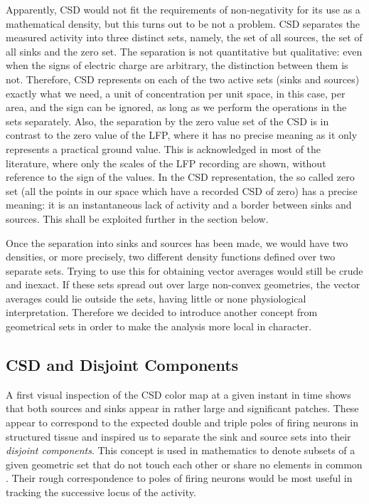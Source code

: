 \documentclass{article}
\begin{document}
Apparently, CSD would not fit the requirements of non-negativity for its use as a mathematical density, but this turns out to be not a problem.  CSD separates the measured activity into three distinct sets, namely, the set of all sources, the set of all sinks and the zero set. The separation is not quantitative but qualitative: even when the signs of electric charge are arbitrary, the distinction between them is not. Therefore, CSD represents on each of the two active sets (sinks and sources) exactly what we need, a unit of concentration per unit space, in this case, per area, and the sign can be ignored, as long as we perform the operations in the sets separately. Also, the separation by the zero value set of the CSD is in contrast to the zero value of the LFP, where it has no precise meaning as it only represents a practical ground value. This is acknowledged in most of the literature, where only the scales of the LFP recording are shown, without reference to the sign of the values. In the CSD representation,  the so called zero set (all the points in our space which have a recorded CSD of zero)  has a precise meaning: it is an instantaneous lack of activity and a border between sinks and sources. This shall be exploited further in the section below.

Once the separation into sinks and sources has been made, we would have two densities, or more precisely, two different density functions defined over two separate sets. Trying to use this for obtaining vector averages would still be crude and inexact. If these sets spread out over large non-convex geometries, the vector averages could lie outside the sets, having little or none physiological interpretation. Therefore we decided to introduce another concept from geometrical sets in order to make the analysis more local in character.


\subsection{CSD and Disjoint Components}

A first visual inspection of the CSD color map at a given instant in time shows that both sources and sinks appear in rather large and significant patches. These appear to correspond to the expected double and triple poles of firing neurons in structured tissue \cite{Buzsaki2012} and inspired us to separate the sink and source  sets into their \emph{disjoint components}. This concept is used in mathematics to denote subsets of a given geometric set that do not touch each other or share no elements in common \cite{Halmos}. Their rough correspondence to poles of firing neurons would be most useful in tracking the successive locus of the activity.
\end{document}
